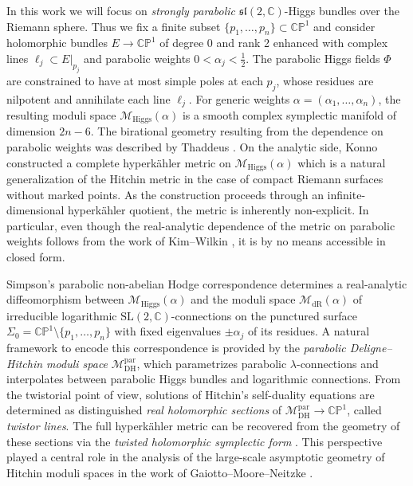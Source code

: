 \documentclass[12pt,a4paper]{amsart}
\theoremstyle{definition}
\theoremstyle{remark}
\newcommand{\C}{\mathbb C}
\newcommand{\CP}{\mathbb{CP}}
\newcommand{\Mcal}{\mathcal M}
\newcommand{\SL}{\mathrm{SL}}
\begin{document}
In this work we will focus on \emph{strongly parabolic} 
$\mathfrak{sl}(2,\C)$-Higgs bundles  over the Riemann sphere. 
Thus we fix a finite subset $\{p_{1},\dots,p_{n}\}\subset\CP^1$ and consider
holomorphic bundles $E\rightarrow\CP^1$ of degree 0 and rank 2 enhanced 
with complex lines $\ell_j\subset E\vert_{p_j}$ and parabolic weights $0<\alpha_j<\tfrac12$. 
The parabolic Higgs fields $\Phi$ are constrained to have at most simple poles 
at each ${p_j}$, whose residues are nilpotent and annihilate each 
 line $\ell_j$. For generic weights $\alpha=(\alpha_1,\dots,\alpha_n)$, the resulting moduli space 
$\Mcal_{\mathrm{Higgs}}(\alpha)$ is a smooth complex symplectic manifold of dimension 
$2n-6$. The birational geometry resulting from the dependence on parabolic weights was 
described by Thaddeus \cite{Thaddeus}. On the analytic side, Konno \cite{Konno} constructed a complete 
hyperk\"ahler metric on $\Mcal_{\mathrm{Higgs}}(\alpha)$ which is a natural generalization 
of the Hitchin metric in the case of compact Riemann surfaces without marked points. 
As the construction proceeds through an infinite-dimensional hyperk\"ahler quotient, 
the metric is inherently non-explicit. In particular, even though the real-analytic dependence of the metric on 
parabolic weights follows from the work of Kim--Wilkin \cite{KiWi}, 
it is by no means accessible in closed form. 
 

Simpson's parabolic non-abelian Hodge correspondence determines a 
real-analytic diffeomorphism between $\Mcal_{\mathrm{Higgs}}(\alpha)$ and the moduli space 
$\Mcal_{\mathrm{dR}}(\alpha)$ of irreducible logarithmic $\SL(2,\C)$-connections on the punctured surface
$\Sigma_{0} =\CP^1\setminus\{p_1,\dots,p_n\}$ 
with fixed 
eigenvalues $\pm\alpha_j$ of its residues. A natural framework to encode 
this correspondence is provided by the
\emph{parabolic Deligne--Hitchin moduli space}
$\Mcal_{\mathrm{DH}}^{\mathrm{par}}$,
which parametrizes parabolic $\lambda$-connections and interpolates
between parabolic Higgs bundles and logarithmic connections.
From the twistorial point of view, solutions of Hitchin's self-duality equations are
determined as distinguished \emph{real holomorphic sections} of
$\Mcal_{\mathrm{DH}}^{\mathrm{par}}\to\CP^1$, called \emph{twistor lines}. The full
hyperk\"ahler metric can be recovered from the geometry of these sections via the {\em twisted
holomorphic symplectic form} \cite{Sim3,HKLR}. This perspective played a central role in the 
analysis of the large-scale asymptotic geometry of Hitchin moduli spaces in the work of
Gaiotto--Moore--Neitzke \cite{GMN}.
\end{document}
